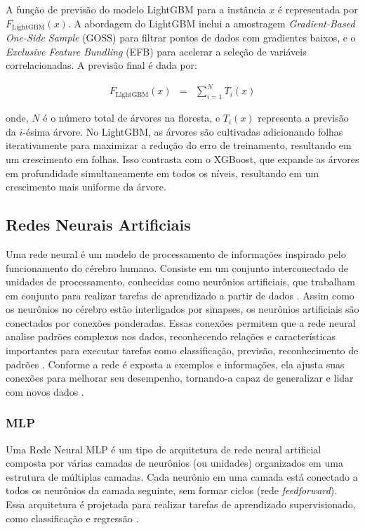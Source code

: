  A função de previsão do modelo LightGBM para a instância $x$ é representada por $F_{\text{LightGBM}}(x)$. A abordagem do LightGBM inclui a amostragem \textit{Gradient-Based One-Side Sample} (GOSS) para filtrar pontos de dados com gradientes baixos, e o \textit{Exclusive Feature Bundling} (EFB) para acelerar a seleção de variáveis correlacionadas. A previsão final é dada por:
 

\begin{eqnarray}
	 F_{\text{LightGBM}}(x) &=& \sum_{i=1}^{N} T_i(x)
\end{eqnarray}

 
 \noindent onde, $N$ é o número total de árvores na floresta, e $T_i(x)$ representa a previsão da $i$-ésima árvore. No LightGBM, as árvores são cultivadas adicionando folhas iterativamente para maximizar a redução do erro de treinamento, resultando em um crescimento em folhas. Isso contrasta com o XGBoost, que expande as árvores em profundidade simultaneamente em todos os níveis, resultando em um crescimento mais uniforme da árvore.
  
  
 \subsection{Redes Neurais Artificiais}
 
 Uma rede neural é um modelo de processamento de informações inspirado pelo funcionamento do cérebro humano. Consiste em um conjunto interconectado de unidades de processamento, conhecidas como neurônios artificiais, que trabalham em conjunto para realizar tarefas de aprendizado a partir de dados \cite{XIANG2018874}. Assim como os neurônios no cérebro estão interligados por sinapses, os neurônios artificiais são conectados por conexões ponderadas. Essas conexões permitem que a rede neural analise padrões complexos nos dados, reconhecendo relações e características importantes para executar tarefas como classificação, previsão, reconhecimento de padrões \cite{BABU201427}. Conforme a rede é exposta a exemplos e informações, ela ajusta suas conexões para melhorar seu desempenho, tornando-a capaz de generalizar e lidar com novos dados \cite{RAO2020107851}.

\subsubsection{MLP}
 
Uma Rede Neural MLP é um tipo de arquitetura de rede neural artificial composta por várias camadas de neurônios (ou unidades) organizados em uma estrutura de múltiplas camadas. Cada neurônio em uma camada está conectado a todos os neurônios da camada seguinte, sem formar ciclos (rede \textit{feedforward}). Essa arquitetura é projetada para realizar tarefas de aprendizado supervisionado, como classificação e regressão \cite{QIN2023543}.

